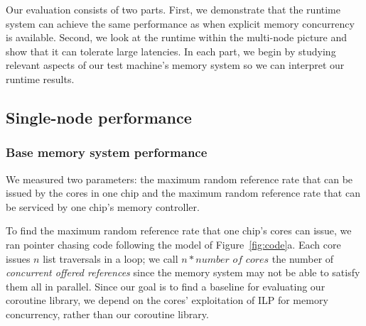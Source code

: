 \documentclass[10pt,nocopyrightspace]{sigplanconf}
\begin{document}
Our evaluation consists of two parts. First, we demonstrate that the
runtime system can achieve the same performance as when 
explicit memory concurrency is available. Second, we look at the runtime
within the multi-node picture and show that it can tolerate large
latencies. In each part, we begin by studying relevant aspects of our
test machine's memory system so we can interpret our runtime results.


\subsection{Single-node performance}


\subsubsection{Base memory system performance}
\label{subsubsec:evalsinglebase}

We measured two parameters: the maximum random reference
rate that can be issued by the cores in one chip and the maximum random
reference rate that can be serviced by one chip's memory controller. 

To find the maximum random reference rate that one chip's cores
can issue, we ran pointer chasing code following the model of
Figure~\ref{fig:code}a. Each core issues $n$ list traversals
in a loop; we call $n * \textit{number of cores}$ the number of
{\em concurrent offered references} since the memory system may not
be able to satisfy them all in parallel. Since our goal is to find a
baseline for evaluating our coroutine library, we depend on the
cores' exploitation of ILP for memory concurrency, rather than our coroutine
library.
\end{document}
